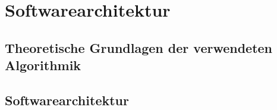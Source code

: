 \chapter{Softwarearchitektur}
\label{cha:Softwarearchitektur}

\section{Theoretische Grundlagen der verwendeten Algorithmik}

\section{Softwarearchitektur}

